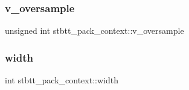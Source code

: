\subsubsection{\texorpdfstring{v\+\_\+oversample}{v\_oversample}}
{\footnotesize\ttfamily unsigned int stbtt\+\_\+pack\+\_\+context\+::v\+\_\+oversample}

\hypertarget{structstbtt__pack__context_a5da0b7b5d3b82d5fc75ea1c8945183fa}{}\label{structstbtt__pack__context_a5da0b7b5d3b82d5fc75ea1c8945183fa} 
\subsubsection{\texorpdfstring{width}{width}}
{\footnotesize\ttfamily int stbtt\+\_\+pack\+\_\+context\+::width}

